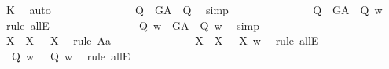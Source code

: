 \begin{isabellebody}
\ K\ \isamarkupfalse%
\ auto\isanewline
\ \ \ \ \ \ \ \ \ \ \ \ \isamarkupfalse%
\ {\isachardoublequoteopen}{\isasymlfloor}{\isacharparenleft}\isactrlbold {\isasymbox}{\isacharparenleft}{\isasymP}\ Q{\isacharparenright}{\isacharparenright}\ \isactrlbold {\isasymrightarrow}\ G\isactrlsup A\ {\isasymRrightarrow}\ Q{\isasymrfloor}{\isachardoublequoteclose}\ \isamarkupfalse%
\ simp\isanewline
\ \ \ \ \ \ \ \ \ \ \ \ \isamarkupfalse%
\ {\isachardoublequoteopen}{\isacharparenleft}{\isacharparenleft}\isactrlbold {\isasymbox}{\isacharparenleft}{\isasymP}\ Q{\isacharparenright}{\isacharparenright}\ \isactrlbold {\isasymrightarrow}\ G\isactrlsup A\ {\isasymRrightarrow}\ Q{\isacharparenright}\ w{\isachardoublequoteclose}\ \isamarkupfalse%
\ {\isacharparenleft}rule\ allE{\isacharparenright}\isanewline
\ \ \ \ \ \ \ \ \ \ \ \ \isamarkupfalse%
\ {}{\isacharcolon}\ {\isachardoublequoteopen}{\isacharparenleft}\isactrlbold {\isasymbox}{\isacharparenleft}{\isasymP}\ Q{\isacharparenright}{\isacharparenright}\ w\ {\isasymlongrightarrow}\ {\isacharparenleft}G\isactrlsup A\ {\isasymRrightarrow}\ Q{\isacharparenright}\ w{\isachardoublequoteclose}\ \isamarkupfalse%
\ simp\ \isanewline
\ \ \ \ \ \ \ \ \ \ \ \ \isamarkupfalse%
\ {\isachardoublequoteopen}{\isasymlfloor}\isactrlbold {\isasymforall}X{\isachardot}\ {\isasymP}\ X\ \isactrlbold {\isasymrightarrow}\ \isactrlbold {\isasymbox}{\isacharparenleft}{\isasymP}\ X{\isacharparenright}{\isasymrfloor}{\isachardoublequoteclose}\ \isamarkupfalse%
\ {\isacharparenleft}rule\ A{}a{\isacharparenright}\ %
\isanewline
\ \ \ \ \ \ \ \ \ \ \ \ \isamarkupfalse%
\ {\isachardoublequoteopen}{\isacharparenleft}\isactrlbold {\isasymforall}X{\isachardot}\ {\isasymP}\ X\ \isactrlbold {\isasymrightarrow}\ {\isacharparenleft}\isactrlbold {\isasymbox}{\isacharparenleft}{\isasymP}\ X{\isacharparenright}{\isacharparenright}{\isacharparenright}\ w{\isachardoublequoteclose}\ \isamarkupfalse%
\ {\isacharparenleft}rule\ allE{\isacharparenright}\isanewline
\ \ \ \ \ \ \ \ \ \ \ \ \isamarkupfalse%
\ {\isachardoublequoteopen}{\isasymP}\ Q\ w\ {\isasymlongrightarrow}\ {\isacharparenleft}\isactrlbold {\isasymbox}{\isacharparenleft}{\isasymP}\ Q{\isacharparenright}{\isacharparenright}\ w{\isachardoublequoteclose}\ \isamarkupfalse%
\ {\isacharparenleft}rule\ allE{\isacharparenright}\isanewline
\ \ \ \ \ \ \ \ \ \ \ \ \isamarkupfalse%

\end{isabellebody}
